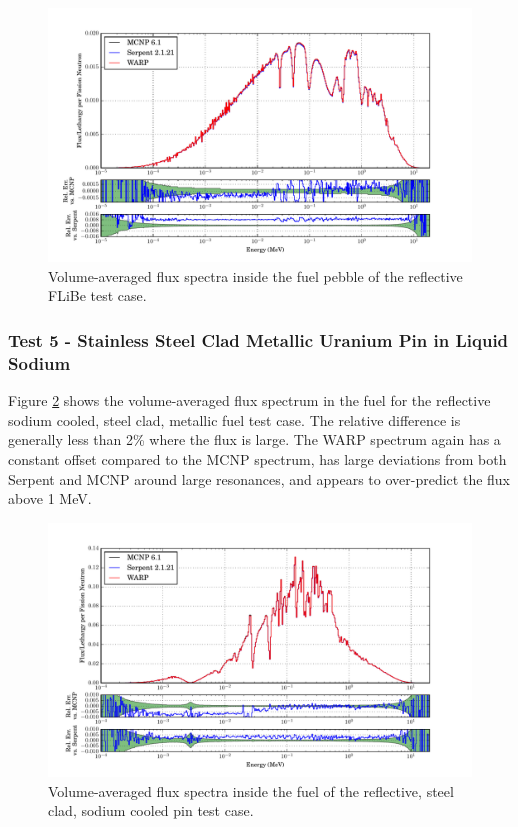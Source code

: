 \documentclass[preprint,12pt]{elsarticle}
\begin{document}
\begin{figure}[h!]
\centering
\includegraphics[width=\textwidth,trim= 1cm 0cm 1cm 0cm]{graphics/flibe_spec.pdf}
\caption{Volume-averaged flux spectra inside the fuel pebble of the reflective FLiBe test case. \label{flibe_spec} }
\end{figure}

\newpage
\subsubsection{Test 5 - Stainless Steel Clad Metallic Uranium Pin in Liquid Sodium}

Figure \ref{sodiumpin_spec} shows the volume-averaged flux spectrum in the fuel for the reflective sodium cooled, steel clad, metallic fuel test case.  The relative difference is generally less than 2\% where the flux is large.  The WARP spectrum again has a constant offset compared to the MCNP spectrum, has large deviations from both Serpent and MCNP around large resonances, and appears to over-predict the flux above 1 MeV.

\begin{figure}[h!]
\centering
\includegraphics[width=\textwidth,trim= 1cm 0cm 1cm 0cm]{graphics/sodiumpin_spec.pdf}
\caption{Volume-averaged flux spectra inside the fuel of the reflective, steel clad, sodium cooled pin test case. \label{sodiumpin_spec} }
\end{figure}
\end{document}
